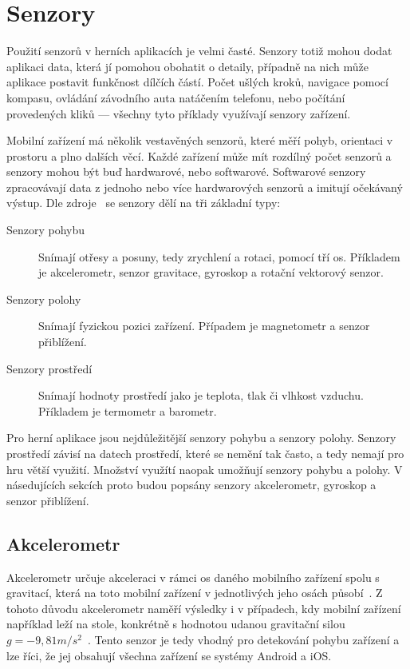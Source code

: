 \section{Senzory}

Použití senzorů v herních aplikacích je velmi časté.
Senzory totiž mohou dodat aplikaci data,
která jí pomohou obohatit o detaily,
případně na nich může aplikace postavit funkčnost dílčích částí.
Počet ušlých kroků,
navigace pomocí kompasu,
ovládání závodního auta natáčením telefonu,
nebo počítání provedených kliků
--- všechny tyto příklady využívají senzory zařízení.
\cite{sensors} 

Mobilní zařízení má několik vestavěných senzorů,
které měří pohyb, orientaci v prostoru a plno dalších věcí.
Každé zařízení může mít rozdílný počet senzorů
a senzory mohou být buď hardwarové, nebo softwarové.
Softwarové senzory zpracovávají data z jednoho nebo více hardwarových senzorů
a imitují očekávaný výstup.
Dle zdroje~\cite{sensors} se senzory dělí na tři základní typy:

\begin{description}
    \item[Senzory pohybu] Snímají otřesy a posuny,
    tedy zrychlení a rotaci,
    pomocí tří os.
    Příkladem je akcelerometr, senzor gravitace, gyroskop
    a rotační vektorový senzor.
    \item[Senzory polohy] Snímají fyzickou pozici zařízení.
    Případem je magnetometr a senzor přiblížení.
    \item[Senzory prostředí] Snímají hodnoty prostředí
    jako je teplota, tlak či vlhkost vzduchu.
    Příkladem je termometr a barometr.
\end{description}

Pro herní aplikace jsou nejdůležitější senzory pohybu a senzory polohy.
Senzory prostředí závisí na datech prostředí,
které se nemění tak často,
a tedy nemají pro hru větší využití.
Množství využítí naopak umožňují senzory pohybu a polohy.
\cite{sensors_android}
V násedujících sekcích proto budou popsány senzory akcelerometr, gyroskop
a senzor přiblížení.

\subsection{Akcelerometr}

Akcelerometr určuje akceleraci v rámci os daného mobilního zařízení
spolu s gravitací,
která na toto mobilní zařízení v jednotlivých jeho osách
působí~\cite{sensors_motion}.
Z tohoto důvodu akcelerometr naměří výsledky i v případech,
kdy mobilní zařízení například leží na stole,
konkrétně s hodnotou udanou
gravitační silou $g = -9,81 m/s^2$~\cite{sensors_motion}.
Tento senzor je tedy vhodný pro detekování pohybu zařízení
a lze říci, že jej obsahují všechna zařízení se systémy Android a iOS.

